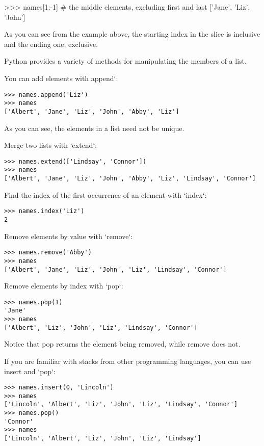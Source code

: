   \textgreater{}\textgreater{}\textgreater{} names{[}1:-1{]} \# the middle elements, excluding first and last
  {[}'Jane', 'Liz', 'John'{]}

As you can see from the example above, the starting index in the slice
is inclusive and the ending one, exclusive.

Python provides a variety of methods for manipulating the members of a
list.

You can add elements with append`:

\begin{verbatim}
>>> names.append('Liz')
>>> names
['Albert', 'Jane', 'Liz', 'John', 'Abby', 'Liz']
\end{verbatim}

As you can see, the elements in a list need not be unique.

Merge two lists with `extend`:

\begin{verbatim}
>>> names.extend(['Lindsay', 'Connor'])
>>> names
['Albert', 'Jane', 'Liz', 'John', 'Abby', 'Liz', 'Lindsay', 'Connor']
\end{verbatim}

Find the index of the first occurrence of an element with `index`:

\begin{verbatim}
>>> names.index('Liz')
2
\end{verbatim}

Remove elements by value with `remove`:

\begin{verbatim}
>>> names.remove('Abby')
>>> names
['Albert', 'Jane', 'Liz', 'John', 'Liz', 'Lindsay', 'Connor']
\end{verbatim}

Remove elements by index with `pop`:

\begin{verbatim}
>>> names.pop(1)
'Jane'
>>> names
['Albert', 'Liz', 'John', 'Liz', 'Lindsay', 'Connor']
\end{verbatim}

Notice that pop returns the element being removed, while remove does
not.

If you are familiar with stacks from other programming languages, you
can use insert and `pop`:

\begin{verbatim}
>>> names.insert(0, 'Lincoln')
>>> names
['Lincoln', 'Albert', 'Liz', 'John', 'Liz', 'Lindsay', 'Connor']
>>> names.pop()
'Connor'
>>> names
['Lincoln', 'Albert', 'Liz', 'John', 'Liz', 'Lindsay']
\end{verbatim}


